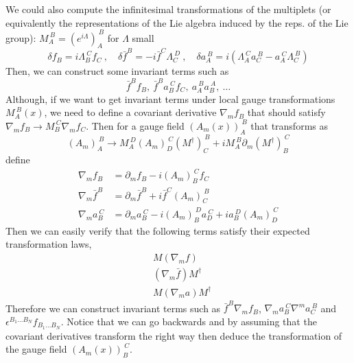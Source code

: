 \documentclass[a4paper,12pt]{article}
\numberwithin{equation}{section}
\numberwithin{exe}{section}
\newcommand{\p}{{\partial}}
\newcommand{\N}{{\nabla}}
\renewcommand{\d}{{\delta}}
\newcommand{\e}{{\epsilon}}
\renewcommand{\L}{{\Lambda}}
\begin{document}
We could also compute the infinitesimal transformations of the multiplets (or equivalently the representations of the Lie algebra induced by the reps. of the Lie group): $M_A^{\ B} = (e^{i\L})_A^{\ B}$ for $\L$ small
	\begin{equation}
	\d f_B = i\L_B^{\ C} f_C\ ,\quad \d \bar f^B = -i\bar f^C \L_C^{\ D}\ ,\quad \d a_A^{\ B} = i(\L_A^{\ C} a_C^{\ B} - a_A^{\ C} \L_C^{\ B})
	\end{equation}
Then, we can construct some invariant terms such as
	\begin{equation}
	\bar f^B f_B,\ \bar f^B a_B^{\ C} f_C,\ a_A^{\ B} a_B^{\ A},\ \ldots
	\end{equation}
Although, if we want to get invariant terms under local gauge transformations $M_A^{\ B}(x)$, we need to define a covariant derivative $\N_m f_B$ that should satisfy $\N_m f_B\rightarrow M_B^{\ C} \N_m f_C$. Then for a gauge field $(A_m(x))_A^{\ B}$ that transforms as
	\begin{equation}
	(A_m)_A^{\ B} \rightarrow M_A^{\ D}(A_m)_D^{\ C}(M^\dagger)_C^{\ B} + i M_A^{\ B} \p_m(M^\dagger)_B^{\ C}
	\end{equation}
define
	\begin{align}
	\N_m f_B & = \p_m f_B - i(A_m)_B^{\ C} f_C \\
	\N_m \bar f^B & = \p_m\bar f^B + i\bar f^C (A_m)_C^{\ B} \\
	\N_m a_B^{\ C} & = \p_m a_B^{\ C} - i(A_m)_B^{\ D} a_D^{\ C} + ia_B^{\ D} (A_m)_D^{\ C}
	\end{align}
Then we can easily verify that the following terms satisfy their expected transformation laws,
	\begin{align}
	&M(\N_m f) \\
	&(\N_m \bar f) M^\dagger \\
	& M(\N_m a) M^\dagger
	\end{align}
Therefore we can construct invariant terms such as $\bar f^B\N_m f_B$, $\N_ma_B^{\ C}\N^m a_C^{\ B}$ and $\e^{B_1\ldots B_N} f_{B_1\ldots B_N}$. Notice that we can go backwards and by assuming that the covariant derivatives transform the right way then deduce the transformation of the gauge field $(A_m(x))_B^{\ C}$.
\end{document}
